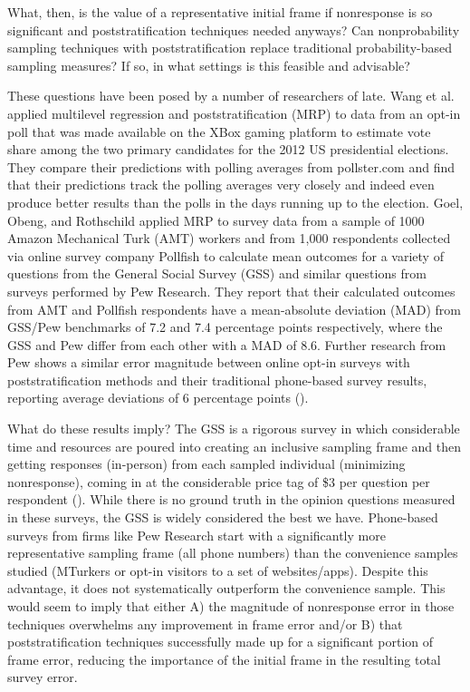 \message{ !name(survey-sampling-with-ads.tex)}\documentclass[a4paper,12pt]{article}
\theoremstyle{proposition}
\begin{document}
What, then, is the value of a representative initial frame if nonresponse is so significant and poststratification techniques needed anyways? Can nonprobability sampling techniques with poststratification replace traditional probability-based sampling measures? If so, in what settings is this feasible and advisable?

These questions have been posed by a number of researchers of late. Wang et al. \parencite*{Wang2015} applied multilevel regression and poststratification (MRP) to data from an opt-in poll that was made available on the XBox gaming platform to estimate vote share among the two primary candidates for the 2012 US presidential elections. They compare their predictions with polling averages from pollster.com and find that their predictions track the polling averages very closely and indeed even produce better results than the polls in the days running up to the election. Goel, Obeng, and Rothschild \parencite*{Goel2015} applied MRP to survey data from a sample of 1000 Amazon Mechanical Turk (AMT) workers and from 1,000 respondents collected via online survey company Pollfish to calculate mean outcomes for a variety of questions from the General Social Survey (GSS) and similar questions from surveys performed by Pew Research. They report that their calculated outcomes from AMT and Pollfish respondents have a mean-absolute deviation (MAD) from GSS/Pew benchmarks of 7.2 and 7.4 percentage points respectively, where the GSS and Pew differ from each other with a MAD of 8.6. Further research from Pew shows a similar error magnitude between online opt-in surveys with poststratification methods and their traditional phone-based survey results, reporting average deviations of 6 percentage points (\cite{Mercer2018}).

What do these results imply? The GSS is a rigorous survey in which considerable time and resources are poured into creating an inclusive sampling frame and then getting responses (in-person) from each sampled individual (minimizing nonresponse), coming in at the considerable price tag of \$3 per question per respondent (\cite{Goel2015}). While there is no ground truth in the opinion questions measured in these surveys, the GSS is widely considered the best we have. Phone-based surveys from firms like Pew Research start with a significantly more representative sampling frame (all phone numbers) than the convenience samples studied (MTurkers or opt-in visitors to a set of websites/apps). Despite this advantage, it does not systematically outperform the convenience sample. This would seem to imply that either A) the magnitude of nonresponse error in those techniques overwhelms any improvement in frame error and/or B) that poststratification techniques successfully made up for a significant portion of frame error, reducing the importance of the initial frame in the resulting total survey error.
\end{document}

